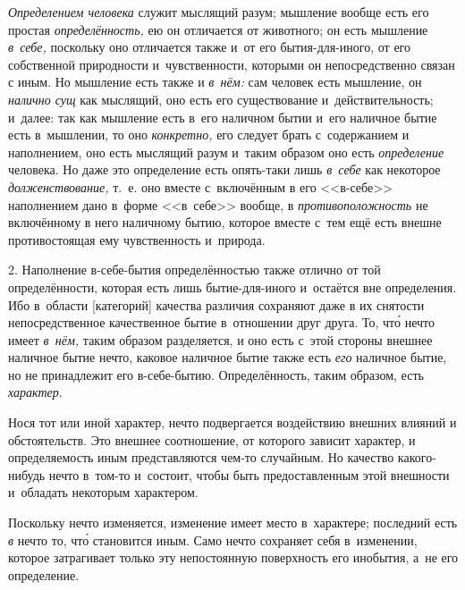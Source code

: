 {\em Определением человека} служит мыслящий разум;
мышление вообще есть его простая {\em определённость,}
ею он отличается от животного; он есть мышление {\em в~себе,}
поскольку оно отличается также и~от его бытия-для-иного, от его
собственной природности и~чувственности, которыми он непосредственно связан
с иным. Но мышление есть также и {\em в~нём:} сам
человек есть мышление, он {\em налично сущ} как
мыслящий, оно есть его существование и~действительность; и~далее: так как
мышление есть в~его наличном бытии и~его наличное бытие есть в~мышлении, то
оно {\em конкретно,} его следует брать с~содержанием и
наполнением, оно есть мыслящий разум и~таким образом оно есть
{\em определение} человека. Но даже это определение
есть опять-таки лишь {\em в~себе} как некоторое
{\em долженствование,} т.~е. оно вместе с~включённым
в его <<в-себе>> наполнением дано в~форме <<в~себе>>
вообще, в {\em противоположность} не включённому
в него наличному бытию, которое вместе с~тем ещё
есть внешне противостоящая ему чувственность и~природа.

2. Наполнение в-себе-бытия определённостью также отлично от той
определённости, которая есть лишь бытие-для-иного и~остаётся вне
определения. Ибо в~области [категорий] качества различия сохраняют даже в
их снятости непосредственное качественное бытие в~отношении друг друга. То,
чт\'{о} нечто имеет {\em в~нём,} таким образом разделяется,
и оно есть с~этой стороны внешнее наличное бытие нечто, каковое наличное
бытие также есть {\em его} наличное бытие, но не
принадлежит его в-себе-бытию. Определённость, таким образом, есть
{\em характер}.

Нося тот или иной характер, нечто подвергается воздействию внешних влияний
и обстоятельств. Это внешнее соотношение, от которого зависит характер, и
определяемость иным представляются чем-то случайным. Но
качество какого-нибудь нечто в~том-то и~состоит, чтобы быть предоставленным
этой внешности и~обладать некоторым характером.

Поскольку нечто изменяется, изменение имеет место в~характере; последний
есть {\em в} нечто то, чт\'{о} становится иным.
Само нечто сохраняет себя в~изменении, которое затрагивает только эту
непостоянную поверхность его инобытия, а~не его определение.


